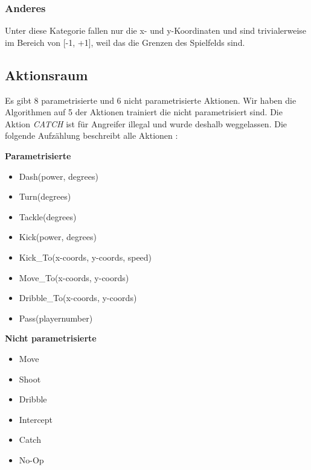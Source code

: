             \subsubsection*{Anderes}
                Unter diese Kategorie fallen nur die x- und y-Koordinaten und sind trivialerweise im Bereich von [-1, +1], weil das die Grenzen des Spielfelds sind.

\newpage
        \subsection{Aktionsraum} \label{actionspace-definition}
            Es gibt 8 parametrisierte und 6 nicht parametrisierte Aktionen. Wir haben die Algorithmen auf 5 der Aktionen trainiert die nicht parametrisiert sind. Die Aktion \textit{CATCH} ist für Angreifer illegal und wurde deshalb weggelassen. Die folgende Aufzählung beschreibt alle Aktionen \cite{hfo}:

            \begin{multicols}{2}
                \textbf{Parametrisierte}
                \begin{itemize}
                    \item Dash(power, degrees)
                    \item Turn(degrees)
                    \item Tackle(degrees)
                    \item Kick(power, degrees)
                    \item Kick\_To(x-coords, y-coords, speed)
                    \item Move\_To(x-coords, y-coords)
                    \item Dribble\_To(x-coords, y-coords)
                    \item Pass(playernumber)
                \end{itemize} \par
                \textbf{Nicht parametrisierte}
                \begin{itemize}
                    \item Move
                    \item Shoot
                    \item Dribble
                    \item Intercept
                    \item Catch
                    \item No-Op
                \end{itemize}
            \end{multicols}

